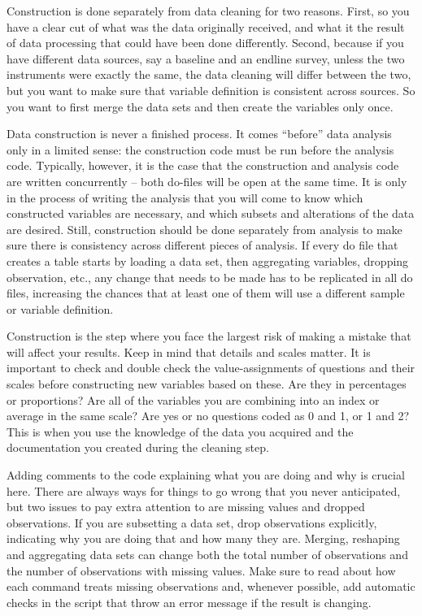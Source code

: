 
Construction is done separately from data cleaning for two reasons. 
First, so you have a clear cut of what was the data originally received,
and what it the result of data processing that could have been done differently.
Second, because if you have different data sources, 
say a baseline and an endline survey, 
unless the two instruments were exactly the same, 
the data cleaning will differ between the two,
but you want to make sure that variable definition is consistent across sources. 
So you want to first merge the data sets and then create the variables only once.

Data construction is never a finished process.
It comes ``before'' data analysis only in a limited sense:
the construction code must be run before the analysis code.
Typically, however, it is the case that the construction and analysis code
are written concurrently -- both do-files will be open at the same time.
It is only in the process of writing the analysis
that you will come to know which constructed variables are necessary,
and which subsets and alterations of the data are desired.
Still, construction should be done separately from analysis 
to make sure there is consistency across different pieces of analysis. 
If every do file that creates a table starts by loading a data set, 
then aggregating variables, dropping observation, etc., 
any change that needs to be made has to be replicated in all do files,
increasing the chances that at least one of them will use a different 
sample or variable definition.

Construction is the step where you face the largest risk 
of making a mistake that will affect your results. 
Keep in mind that details and scales matter. 
It is important to check and double check the value-assignments of questions 
and their scales before constructing new variables based on these. 
Are they in percentages or proportions? 
Are all of the variables you are combining into an index or average in the same scale? 
Are yes or no questions coded as 0 and 1, or 1 and 2?
This is when you use the knowledge of the data you acquired and
the documentation you created during the cleaning step.

Adding comments to the code explaining what you are doing and why is crucial here.
There are always ways for things to go wrong that you never anticipated,
but two issues to pay extra attention to are missing values and dropped observations. 
If you are subsetting a data set, drop observations explicitly, 
indicating why you are doing that and how many they are.
Merging, reshaping and aggregating data sets can change both the total number of observations
and the number of observations with missing values.
Make sure to read about how each command treats missing observations and, 
whenever possible, add automatic checks in the script that throw an error message 
if the result is changing.

